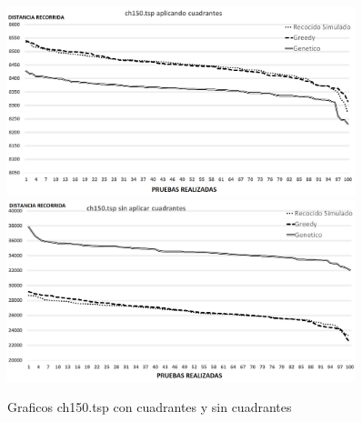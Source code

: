  \begin{figure}[hbtp]
    \centering
        \includegraphics[width=0.9\textwidth]{PruebasResultados/Experimentos_Graficos_Con/ch150.png}
        \includegraphics[width=0.9\textwidth]{PruebasResultados/Experimentos_Graficos_Sin/ch150.png}
        \caption{Graficos ch150.tsp con cuadrantes y sin cuadrantes}
        \label{fig:a280_grafica.png}
\end{figure}
\newpage

